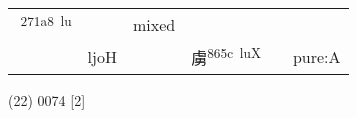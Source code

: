 \documentclass[14pt,a4paper]{scrartcl}
\begin{document}
\begin{longtable}[c]{@{}llllll@{}}
\begin{minipage}[t]{0.14\columnwidth}\raggedright\strut
𧆨\textsuperscript{271a8~lu}
\strut\end{minipage} &
\begin{minipage}[t]{0.14\columnwidth}\raggedright\strut
\strut\end{minipage} &
\begin{minipage}[t]{0.14\columnwidth}\raggedright\strut
mixed
\strut\end{minipage}\tabularnewline
\begin{minipage}[t]{0.14\columnwidth}\raggedright\strut
𧆨
\strut\end{minipage} &
\begin{minipage}[t]{0.14\columnwidth}\raggedright\strut
ljoH
\strut\end{minipage} &
\begin{minipage}[t]{0.14\columnwidth}\raggedright\strut
\strut\end{minipage} &
\begin{minipage}[t]{0.14\columnwidth}\raggedright\strut
虜\textsuperscript{865c~luX}
\strut\end{minipage} &
\begin{minipage}[t]{0.14\columnwidth}\raggedright\strut
\strut\end{minipage} &
\begin{minipage}[t]{0.14\columnwidth}\raggedright\strut
pure:A
\strut\end{minipage}\tabularnewline
\bottomrule
\end{longtable}

(22) 0074 {[}2{]}
\end{document}
